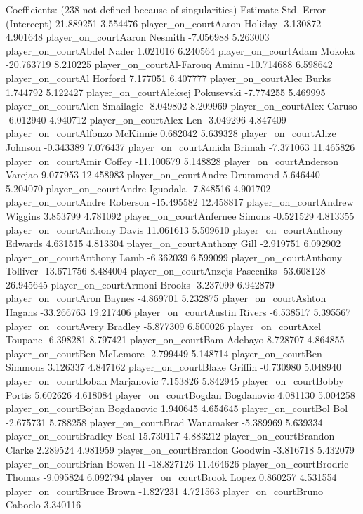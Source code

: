 \documentclass[
  landscape]{article}
\begin{document}
Coefficients: (238 not defined because of singularities) Estimate Std.
Error (Intercept) 21.889251 3.554476 player\_on\_courtAaron Holiday
-3.130872 4.901648 player\_on\_courtAaron Nesmith -7.056988 5.263003
player\_on\_courtAbdel Nader 1.021016 6.240564 player\_on\_courtAdam
Mokoka -20.763719 8.210225 player\_on\_courtAl-Farouq Aminu -10.714688
6.598642 player\_on\_courtAl Horford 7.177051 6.407777
player\_on\_courtAlec Burks 1.744792 5.122427 player\_on\_courtAleksej
Pokusevski -7.774255 5.469995 player\_on\_courtAlen Smailagic -8.049802
8.209969 player\_on\_courtAlex Caruso -6.012940 4.940712
player\_on\_courtAlex Len -3.049296 4.847409 player\_on\_courtAlfonzo
McKinnie 0.682042 5.639328 player\_on\_courtAlize Johnson -0.343389
7.076437 player\_on\_courtAmida Brimah -7.371063 11.465826
player\_on\_courtAmir Coffey -11.100579 5.148828
player\_on\_courtAnderson Varejao 9.077953 12.458983
player\_on\_courtAndre Drummond 5.646440 5.204070 player\_on\_courtAndre
Iguodala -7.848516 4.901702 player\_on\_courtAndre Roberson -15.495582
12.458817 player\_on\_courtAndrew Wiggins 3.853799 4.781092
player\_on\_courtAnfernee Simons -0.521529 4.813355
player\_on\_courtAnthony Davis 11.061613 5.509610
player\_on\_courtAnthony Edwards 4.631515 4.813304
player\_on\_courtAnthony Gill -2.919751 6.092902
player\_on\_courtAnthony Lamb -6.362039 6.599099
player\_on\_courtAnthony Tolliver -13.671756 8.484004
player\_on\_courtAnzejs Pasecniks -53.608128 26.945645
player\_on\_courtArmoni Brooks -3.237099 6.942879 player\_on\_courtAron
Baynes -4.869701 5.232875 player\_on\_courtAshton Hagans -33.266763
19.217406 player\_on\_courtAustin Rivers -6.538517 5.395567
player\_on\_courtAvery Bradley -5.877309 6.500026 player\_on\_courtAxel
Toupane -6.398281 8.797421 player\_on\_courtBam Adebayo 8.728707
4.864855 player\_on\_courtBen McLemore -2.799449 5.148714
player\_on\_courtBen Simmons 3.126337 4.847162 player\_on\_courtBlake
Griffin -0.730980 5.048940 player\_on\_courtBoban Marjanovic 7.153826
5.842945 player\_on\_courtBobby Portis 5.602626 4.618084
player\_on\_courtBogdan Bogdanovic 4.081130 5.004258
player\_on\_courtBojan Bogdanovic 1.940645 4.654645 player\_on\_courtBol
Bol -2.675731 5.788258 player\_on\_courtBrad Wanamaker -5.389969
5.639334 player\_on\_courtBradley Beal 15.730117 4.883212
player\_on\_courtBrandon Clarke 2.289524 4.981959
player\_on\_courtBrandon Goodwin -3.816718 5.432079
player\_on\_courtBrian Bowen II -18.827126 11.464626
player\_on\_courtBrodric Thomas -9.095824 6.092794
player\_on\_courtBrook Lopez 0.860257 4.531554 player\_on\_courtBruce
Brown -1.827231 4.721563 player\_on\_courtBruno Caboclo 3.340116
\end{document}
